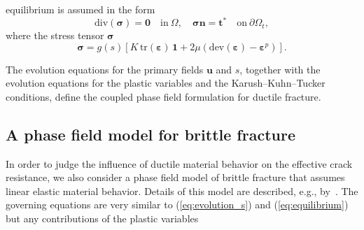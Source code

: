 \documentclass[pdflatex,sn-mathphys-num]{sn-jnl}%
\theoremstyle{thmstyleone}%
\theoremstyle{thmstyletwo}%
\theoremstyle{thmstylethree}%
\begin{document}
 equilibrium is assumed in the form
\begin{equation}
    \text{div}(\boldsymbol{\sigma}) = \boldsymbol{0} \quad \text{in} \ \Omega, 
    \quad 
    \boldsymbol{\sigma}\boldsymbol{n} = \boldsymbol{t}^* 
    \quad \text{on} \ \partial\Omega_t,
    \label{eq:equilibrium}
\end{equation}
where the stress tensor $\boldsymbol{\sigma}$ 
\begin{equation}
    \boldsymbol{\sigma} = g(s)\left[
    K\,\text{tr}(\boldsymbol{\varepsilon})\,\boldsymbol{1}
    + 2\mu\left(\text{dev}(\boldsymbol{\varepsilon}) - \boldsymbol{\varepsilon}^p\right)
    \right].
    \label{eq:sigma_plast}
\end{equation}

The evolution equations for the primary fields $\boldsymbol{u}$ and $s$, together with the evolution equations for the plastic variables and the Karush--Kuhn--Tucker conditions, define the coupled phase field formulation for ductile fracture.


\subsection{A phase field model for brittle fracture}
\label{sec:phasefield_elastic}

In order to judge the influence of ductile material behavior on the effective crack resistance, 
we also consider a phase field model of brittle fracture that assumes linear elastic material behavior. 
Details of this model are described, e.g., by~\cite{kuhn_continuum_2010}. The governing equations 
are very similar to (\ref{eq:evolution_s}) and (\ref{eq:equilibrium}) but 
any contributions of the plastic variables\replaced{:}{  }
\end{document}
